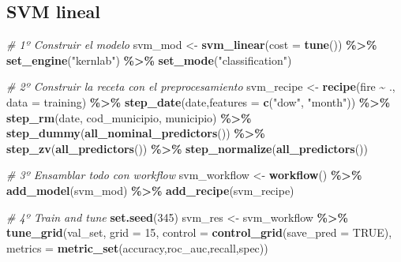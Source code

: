 \documentclass[12pt,a4paper,]{book}
\newenvironment{Shaded}{\begin{snugshade}}{\end{snugshade}}
\newcommand{\AttributeTok}[1]{\textcolor[rgb]{0.13,0.29,0.53}{#1}}
\newcommand{\CommentTok}[1]{\textcolor[rgb]{0.56,0.35,0.01}{\textit{#1}}}
\newcommand{\ConstantTok}[1]{\textcolor[rgb]{0.56,0.35,0.01}{#1}}
\newcommand{\DecValTok}[1]{\textcolor[rgb]{0.00,0.00,0.81}{#1}}
\newcommand{\FunctionTok}[1]{\textcolor[rgb]{0.13,0.29,0.53}{\textbf{#1}}}
\newcommand{\NormalTok}[1]{#1}
\newcommand{\OtherTok}[1]{\textcolor[rgb]{0.56,0.35,0.01}{#1}}
\newcommand{\SpecialCharTok}[1]{\textcolor[rgb]{0.81,0.36,0.00}{\textbf{#1}}}
\newcommand{\StringTok}[1]{\textcolor[rgb]{0.31,0.60,0.02}{#1}}
\newcounter{dummy}
\numberwithin{dummy}{section}
\theoremstyle{ocrenumbox}
\theoremstyle{blacknumex}
\theoremstyle{blacknumbox}
\theoremstyle{ocrenum}
\theoremstyle{ocrenum}
\begin{document}
\hypertarget{svm-lineal}{%
\subsection{SVM lineal}\label{svm-lineal}}

\begin{Shaded}
\begin{Highlighting}[]
\CommentTok{\# 1º Construir el modelo}
\NormalTok{svm\_mod }\OtherTok{\textless{}{-}} 
  \FunctionTok{svm\_linear}\NormalTok{(}\AttributeTok{cost =} \FunctionTok{tune}\NormalTok{()) }\SpecialCharTok{\%\textgreater{}\%} 
  \FunctionTok{set\_engine}\NormalTok{(}\StringTok{"kernlab"}\NormalTok{) }\SpecialCharTok{\%\textgreater{}\%} 
  \FunctionTok{set\_mode}\NormalTok{(}\StringTok{"classification"}\NormalTok{)}

\CommentTok{\# 2º Construir la receta con el preprocesamiento}
\NormalTok{svm\_recipe }\OtherTok{\textless{}{-}} 
  \FunctionTok{recipe}\NormalTok{(fire }\SpecialCharTok{\textasciitilde{}}\NormalTok{ ., }\AttributeTok{data =}\NormalTok{ training) }\SpecialCharTok{\%\textgreater{}\%} 
  \FunctionTok{step\_date}\NormalTok{(date,}\AttributeTok{features =} \FunctionTok{c}\NormalTok{(}\StringTok{"dow"}\NormalTok{, }\StringTok{"month"}\NormalTok{)) }\SpecialCharTok{\%\textgreater{}\%} 
  \FunctionTok{step\_rm}\NormalTok{(date, cod\_municipio, municipio) }\SpecialCharTok{\%\textgreater{}\%}
  \FunctionTok{step\_dummy}\NormalTok{(}\FunctionTok{all\_nominal\_predictors}\NormalTok{()) }\SpecialCharTok{\%\textgreater{}\%} 
  \FunctionTok{step\_zv}\NormalTok{(}\FunctionTok{all\_predictors}\NormalTok{()) }\SpecialCharTok{\%\textgreater{}\%} 
  \FunctionTok{step\_normalize}\NormalTok{(}\FunctionTok{all\_predictors}\NormalTok{())}

\CommentTok{\# 3º Ensamblar todo con workflow}
\NormalTok{svm\_workflow }\OtherTok{\textless{}{-}} 
  \FunctionTok{workflow}\NormalTok{() }\SpecialCharTok{\%\textgreater{}\%} 
  \FunctionTok{add\_model}\NormalTok{(svm\_mod) }\SpecialCharTok{\%\textgreater{}\%} 
  \FunctionTok{add\_recipe}\NormalTok{(svm\_recipe)}

\CommentTok{\# 4º Train and tune}
\FunctionTok{set.seed}\NormalTok{(}\DecValTok{345}\NormalTok{)}
\NormalTok{svm\_res }\OtherTok{\textless{}{-}} 
\NormalTok{  svm\_workflow }\SpecialCharTok{\%\textgreater{}\%} 
  \FunctionTok{tune\_grid}\NormalTok{(val\_set,}
            \AttributeTok{grid =} \DecValTok{15}\NormalTok{,}
            \AttributeTok{control =} \FunctionTok{control\_grid}\NormalTok{(}\AttributeTok{save\_pred =} \ConstantTok{TRUE}\NormalTok{),}
            \AttributeTok{metrics =} \FunctionTok{metric\_set}\NormalTok{(accuracy,roc\_auc,recall,spec))}


\end{Highlighting}
\end{Shaded}
\end{document}
